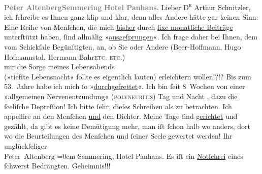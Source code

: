 \begin{ledgroupsized}[t]{13cm}
           \noindent{}{\pb}\textcolor{gray}{\textbf{Peter Altenberg}}\hfill \textcolor{gray}{\textbf{Semmering}}\pend
           \pstart
           \raggedleft{}\textcolor{gray}{\textbf{Hotel Panhans.}}\pend
           \pstart{}Lieber \textsc{D\textsuperscript{r}} Arthur Schnitzler,\pend\pstart
           ich ſchreibe es Ihnen ganz klip und klar, denn alles Andere hätte gar keinen
               Sinn:\pend
           \pstart
           Eine Reihe von Menſchen, die mich \uline{bisher} durch \uline{fixe monatliche Beiträge} unterſtützt haben, ſind
               allmälig »\uline{ausgeſprungen}«. Ich frage daher bei Ihnen,
               dem vom Schickſale Begünſtigten, an, ob Sie oder Andere (Beer-Hoffmann, Hugo
                  Hofmannstal, Hermann Bahr\textsc{etc. etc.}) {\\}mir die Sorge meines
               Lebensabends{\\}(»tiefſte Lebensnacht« ſollte es eigentlich lauten) erleichtern
               wollen!?!? \introOben{}Bis zum 53. Jahre habe ich mich ſo »\uline{durchgefrettet}«.\introOben{}\pend
           \pstart
           {\pb}Ich bin ſeit 8 Wochen von einer
               »allgemeinen Nervenentzündung« (\textsc{polyneuritis}) Tag und Nacht
                  , dazu die ſeeliſche Depreſſion!\pend
           \pstart
           Ich bitte ſehr, dieſes Schreiben als  zu
               betrachten. \introOben{}Ich appellire an den Menſchen \uline{und} den Dichter.\introOben{}\pend
           \pstart
           Meine Tage ſind \uline{gerichtet} und gezählt, da gibt es
               keine Demütigung mehr, man iſt ſchon halb wo anders, dort wo die Beurteilungen des
               Menſchen und ſeiner Seele  gewertet werden!\pend
           \pstart
           Ihr unglückſeliger{\\[\baselineskip]}\spacefill\mbox{Peter Altenberg}\pend
           \leftskip=0em{}\pstart
           \noindent{}Semmering, Hotel Panhans.\pend
           \pstart
           Es iſt ein \uline{Notſchrei} eines ſchwerst
                  Bedrängten.\pend
           \pstart
           \raggedleft{}Geheimnis!!!\pend
           
         
         \endnumbering{}\end{ledgroupsized}  \newcommand{\dateiname}{L02094}\newcommand{\titel}{Peter Altenberg an Arthur Schnitzler, [7. 11. 1912]}\newcommand{\editorInnen}{ Martin Anton Müller und Gerd-Hermann Susen}
      